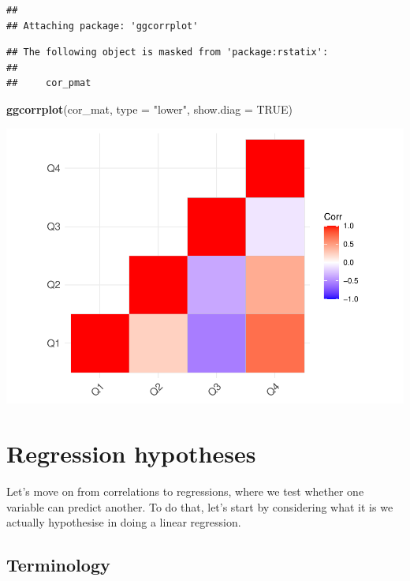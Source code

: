 \documentclass[
]{book}
\newenvironment{Shaded}{\begin{snugshade}}{\end{snugshade}}
\newcommand{\AttributeTok}[1]{\textcolor[rgb]{0.13,0.29,0.53}{#1}}
\newcommand{\ConstantTok}[1]{\textcolor[rgb]{0.56,0.35,0.01}{#1}}
\newcommand{\FunctionTok}[1]{\textcolor[rgb]{0.13,0.29,0.53}{\textbf{#1}}}
\newcommand{\NormalTok}[1]{#1}
\newcommand{\StringTok}[1]{\textcolor[rgb]{0.31,0.60,0.02}{#1}}
\begin{document}
\begin{verbatim}
## 
## Attaching package: 'ggcorrplot'
\end{verbatim}

\begin{verbatim}
## The following object is masked from 'package:rstatix':
## 
##     cor_pmat
\end{verbatim}

\begin{Shaded}
\begin{Highlighting}[]
\FunctionTok{ggcorrplot}\NormalTok{(cor\_mat, }\AttributeTok{type =} \StringTok{"lower"}\NormalTok{, }\AttributeTok{show.diag =} \ConstantTok{TRUE}\NormalTok{)}
\end{Highlighting}
\end{Shaded}

\includegraphics{_main_files/figure-latex/unnamed-chunk-187-1.pdf}

\hypertarget{regression-hypotheses}{%
\section{Regression hypotheses}\label{regression-hypotheses}}

Let's move on from correlations to regressions, where we test whether one variable can predict another. To do that, let's start by considering what it is we actually hypothesise in doing a linear regression.

\hypertarget{terminology}{%
\subsection{Terminology}\label{terminology}}
\end{document}
